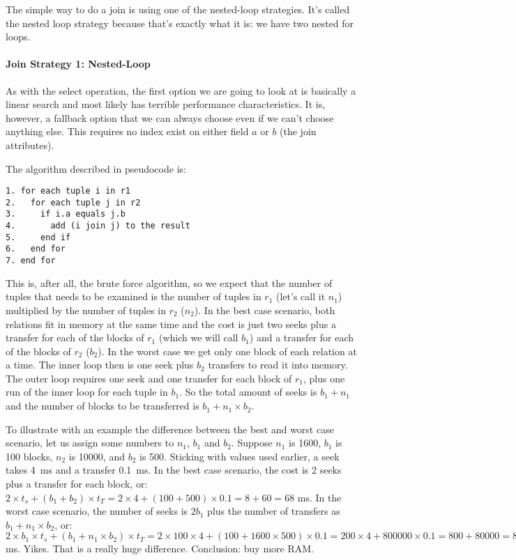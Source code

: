 \documentclass[a4paper]{report}
\begin{document}
The simple way to do a join is using one of the nested-loop strategies. It's called the nested loop strategy because that's exactly what it is: we have two nested for loops.

\paragraph{Join Strategy 1: Nested-Loop}
As with the select operation, the first option we are going to look at is basically a linear search and most likely has terrible performance characteristics. It is, however, a fallback option that we can always choose even if we can't choose anything else. This requires no index exist on either field $a$ or $b$ (the join attributes).

The algorithm described in pseudocode is:
\begin{verbatim}
1. for each tuple i in r1
2.   for each tuple j in r2
3.     if i.a equals j.b
4.       add (i join j) to the result
5.     end if
6.   end for
7. end for
\end{verbatim}

This is, after all, the brute force algorithm, so we expect that the number of tuples that needs to be examined is the number of tuples in $r_{1}$ (let's call it $n_{1}$) multiplied by the number of tuples in $r_{2}$ ($n_{2}$). In the best case scenario, both relations fit in memory at the same time and the cost is just two seeks plus a transfer for each of the blocks of $r_{1}$ (which we will call $b_{1}$) and a transfer for each of the blocks of $r_{2}$ ($b_{2}$). In the worst case we get only one block of each relation at a time. The inner loop then is one seek plus $b_{2}$ transfers to read it into memory. The outer loop requires one seek and one transfer for each block of $r_{1}$, plus one run of the inner loop for each tuple in $b_{1}$. So the total amount of seeks is $b_{1} + n_{1}$ and the number of blocks to be transferred is $b_{1} + n_{1} \times b_{2}$.

To illustrate with an example the difference between the best and worst case scenario, let us assign some numbers to $n_{1}$, $b_{1}$ and $b_{2}$. Suppose $n_{1}$ is 1600, $b_{1}$ is 100 blocks, $n_{2}$ is 10000, and $b_{2}$ is 500. Sticking with values used earlier, a seek takes 4~ms and a transfer 0.1~ms. In the best case scenario, the cost is 2 seeks plus a transfer for each block, or: $2 \times t_{s} + (b_{1} + b_{2}) \times t_{T} = 2 \times 4 + (100 + 500) \times 0.1 = 8 + 60 = 68$ ms. In the worst case scenario, the number of seeks is $2b_{1}$ plus the number of transfers as $b_{1} + n_{1} \times b_{2}$, or: $2 \times b_{1} \times t_{s} + (b_{1} + n_{1} \times b_{2}) \times t_{T} = 2 \times 100 \times 4 + (100 + 1600 \times 500) \times 0.1 = 200 \times 4 + 800000 \times 0.1 = 800 + 80000 = 80800$ ms. Yikes. That is a really huge difference. Conclusion: buy more RAM.
\end{document}

